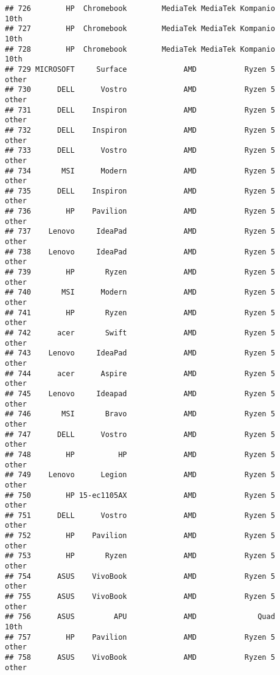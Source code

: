 \documentclass[
]{article}
\begin{document}
\begin{verbatim}
## 726        HP  Chromebook        MediaTek MediaTek Kompanio            10th
## 727        HP  Chromebook        MediaTek MediaTek Kompanio            10th
## 728        HP  Chromebook        MediaTek MediaTek Kompanio            10th
## 729 MICROSOFT     Surface             AMD           Ryzen 5           other
## 730      DELL      Vostro             AMD           Ryzen 5           other
## 731      DELL    Inspiron             AMD           Ryzen 5           other
## 732      DELL    Inspiron             AMD           Ryzen 5           other
## 733      DELL      Vostro             AMD           Ryzen 5           other
## 734       MSI      Modern             AMD           Ryzen 5           other
## 735      DELL    Inspiron             AMD           Ryzen 5           other
## 736        HP    Pavilion             AMD           Ryzen 5           other
## 737    Lenovo     IdeaPad             AMD           Ryzen 5           other
## 738    Lenovo     IdeaPad             AMD           Ryzen 5           other
## 739        HP       Ryzen             AMD           Ryzen 5           other
## 740       MSI      Modern             AMD           Ryzen 5           other
## 741        HP       Ryzen             AMD           Ryzen 5           other
## 742      acer       Swift             AMD           Ryzen 5           other
## 743    Lenovo     IdeaPad             AMD           Ryzen 5           other
## 744      acer      Aspire             AMD           Ryzen 5           other
## 745    Lenovo     Ideapad             AMD           Ryzen 5           other
## 746       MSI       Bravo             AMD           Ryzen 5           other
## 747      DELL      Vostro             AMD           Ryzen 5           other
## 748        HP          HP             AMD           Ryzen 5           other
## 749    Lenovo      Legion             AMD           Ryzen 5           other
## 750        HP 15-ec1105AX             AMD           Ryzen 5           other
## 751      DELL      Vostro             AMD           Ryzen 5           other
## 752        HP    Pavilion             AMD           Ryzen 5           other
## 753        HP       Ryzen             AMD           Ryzen 5           other
## 754      ASUS    VivoBook             AMD           Ryzen 5           other
## 755      ASUS    VivoBook             AMD           Ryzen 5           other
## 756      ASUS         APU             AMD              Quad            10th
## 757        HP    Pavilion             AMD           Ryzen 5           other
## 758      ASUS    VivoBook             AMD           Ryzen 5           other

\end{verbatim}
\end{document}
